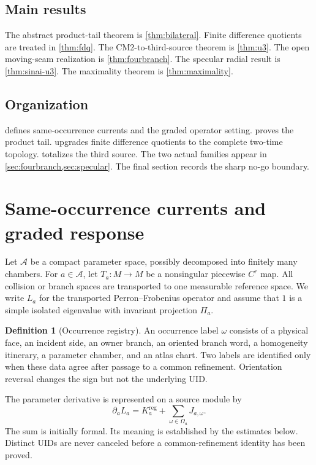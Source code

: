 \documentclass[11pt,reqno]{amsart}
\theoremstyle{definition}
\newtheorem{definition}[theorem]{Definition}
\theoremstyle{remark}
\newcommand{\A}{\mathcal A}
\begin{document}
\subsection*{Main results}
The abstract product-tail theorem is \cref{thm:bilateral}.  Finite difference
quotients are treated in \cref{thm:fdq}.  The CM2-to-third-source theorem is
\cref{thm:u3}.  The open moving-seam realization is
\cref{thm:fourbranch}.  The specular radial result is
\cref{thm:sinai-u3}.  The maximality theorem is
\cref{thm:maximality}.

\subsection*{Organization}
 defines same-occurrence currents and the graded operator
setting.   proves the product tail.
 upgrades finite difference quotients to the complete two-time
topology.   totalizes the third source.  The two actual families
appear in \cref{sec:fourbranch,sec:specular}.  The final section records the
sharp no-go boundary.

\section{Same-occurrence currents and graded response}\label{sec:framework}

Let $\A$ be a compact parameter space, possibly decomposed into finitely many
chambers.  For $a\in\A$, let $T_a:M\to M$ be a nonsingular piecewise $C^r$ map.
All collision or branch spaces are transported to one measurable reference
space.  We write $L_a$ for the transported Perron--Frobenius operator and
assume that $1$ is a simple isolated eigenvalue with invariant projection
$\Pi_a$.

\begin{definition}[Occurrence registry]\label{def:registry}
An occurrence label $\omega$ consists of a physical face, an incident side, an
owner branch, an oriented branch word, a homogeneity itinerary, a parameter
chamber, and an atlas chart.  Two labels are identified only when these data
agree after passage to a common refinement.  Orientation reversal changes the
sign but not the underlying UID.
\end{definition}

The parameter derivative is represented on a source module by
\begin{equation}\label{eq:source-decomp}
 \partial_aL_a=K_a^{\mathrm{reg}}+
 \sum_{\omega\in\Omega_a}J_{a,\omega}.
\end{equation}
The sum is initially formal.  Its meaning is established by the estimates
below.  Distinct UIDs are never canceled before a common-refinement identity
has been proved.
\end{document}
